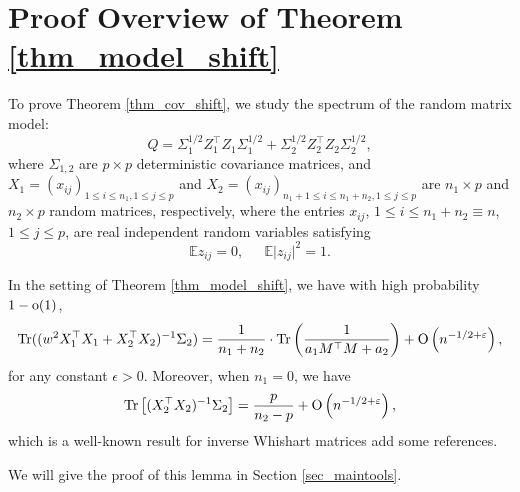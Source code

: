 \section{Proof Overview of Theorem \ref{thm_model_shift}}

\noindent{}
To prove Theorem \ref{thm_cov_shift}, we study the spectrum of the random matrix model:
$$Q= \Sigma_1^{1/2}  Z_1^{\top} Z_1 \Sigma_1^{1/2}  + \Sigma_2^{1/2}  Z_2^{\top} Z_2 \Sigma_2^{1/2} ,$$
where $\Sigma_{1,2}$ are $p\times p$ deterministic covariance matrices, and $X_1=(x_{ij})_{1\le i \le n_1, 1\le j \le p}$ and $X_2=(x_{ij})_{n_1+1\le i \le n_1+n_2, 1\le j \le p}$ are $n_1\times p$ and $n_2 \times p$ random matrices, respectively, where the entries $x_{ij}$, $1 \leq i \leq n_1+n_2\equiv n$, $1 \leq j \leq p$, are real independent random variables satisfying
\begin{equation}\label{eq_12moment} %
\mathbb{E} z_{ij} =0, \ \quad \ \mathbb{E} \vert z_{ij} \vert^2  = 1.
\end{equation}

\begin{lemma}\label{lem_cov_shift}
	In the setting of Theorem \ref{thm_model_shift}, we have with high probability $1-{\rm o}(1)$,
\begin{align}\label{lem_cov_shift_eq}
\operatorname{Tr} ((w^2 X_1^{\top}X_1 + X_2^{\top}X_2)^{-1}\Sigma_2) = \frac{1}{n_1+n_2}\cdot \operatorname{Tr} \left( \frac{1}{a_1 M^\top M + a_2} \right) +\operatorname{O}\left( n^{-1/2+\varepsilon}\right),
\end{align}
	for any constant $\epsilon>0$. %
	Moreover, when $n_1 = 0$, we have %
	\begin{align}\label{lem_cov_shift_eq2} \operatorname{Tr}\left[(X_2^{\top}X_2)^{-1}\Sigma_2\right] = \frac{p}{n_2-p} + \operatorname{O}\left(n^{-1/2+\varepsilon}\right), \end{align}
which is a well-known result for inverse Whishart matrices {\color{red}add some references}.
\end{lemma}
We will give the proof of this lemma in Section \ref{sec_maintools}.

